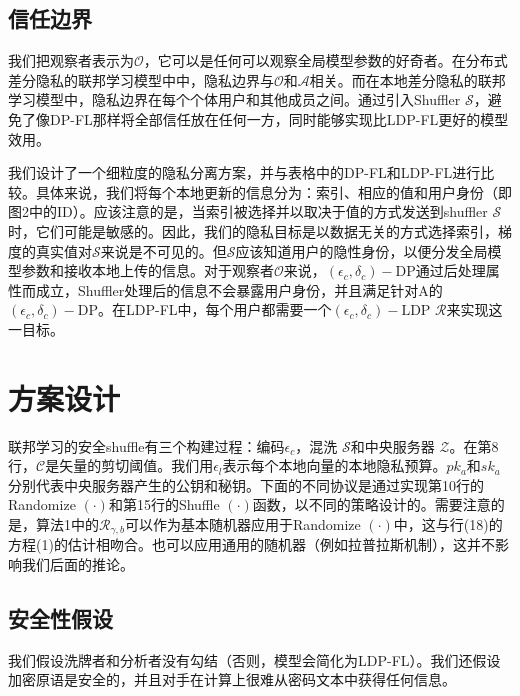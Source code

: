 \subsection{信任边界}
我们把观察者表示为$\mathcal{O}$，它可以是任何可以观察全局模型参数的好奇者。在分布式差分隐私的联邦学习模型中中，隐私边界与$\mathcal{O}$和$\mathcal{A}$相关。而在本地差分隐私的联邦学习模型中，隐私边界在每个个体用户和其他成员之间。通过引入Shuffler $\mathcal{S}$，避免了像DP-FL那样将全部信任放在任何一方，同时能够实现比LDP-FL更好的模型效用。

我们设计了一个细粒度的隐私分离方案，并与表格中的DP-FL和LDP-FL进行比较。具体来说，我们将每个本地更新的信息分为：索引、相应的值和用户身份（即图2中的ID）。应该注意的是，当索引被选择并以取决于值的方式发送到shuffler $\mathcal{S}$时，它们可能是敏感的。因此，我们的隐私目标是以数据无关的方式选择索引，梯度的真实值对$\mathcal{S}$来说是不可见的。但$\mathcal{S}$应该知道用户的隐性身份，以便分发全局模型参数和接收本地上传的信息。对于观察者$\mathcal{O}$来说，$\left(\epsilon_{c}, \delta_{c}\right)-\mathrm{DP}$通过后处理属性而成立\cite{ref47}，Shuffler处理后的信息不会暴露用户身份，并且满足针对A的$\left(\epsilon_{c}, \delta_{c}\right)-\mathrm{DP}$。在LDP-FL中，每个用户都需要一个$\left(\epsilon_{c}, \delta_{c}\right)-\mathrm{LDP}$ $\mathcal{R}$来实现这一目标。

\section{方案设计}
联邦学习的安全shuffle有三个构建过程：编码$\epsilon_{c}$，混洗 $\mathcal{S}$和中央服务器 $\mathcal{Z}$。在第8行，$\mathcal{C}$是矢量的剪切阈值。我们用$\epsilon_{l}$表示每个本地向量的本地隐私预算。$p k_{a}$和$s k_{a}$分别代表中央服务器产生的公钥和秘钥。下面的不同协议是通过实现第10行的Randomize $(\cdot)$和第15行的Shuffle $(\cdot)$函数，以不同的策略设计的。需要注意的是，算法1中的$\mathcal{R}_{\gamma, b}$可以作为基本随机器应用于Randomize $(\cdot)$中，这与行(18)的方程(1)的估计相吻合。也可以应用通用的随机器（例如拉普拉斯机制），这并不影响我们后面的推论。

\subsection{安全性假设}
我们假设洗牌者和分析者没有勾结（否则，模型会简化为LDP-FL）。我们还假设加密原语是安全的，并且对手在计算上很难从密码文本中获得任何信息。


